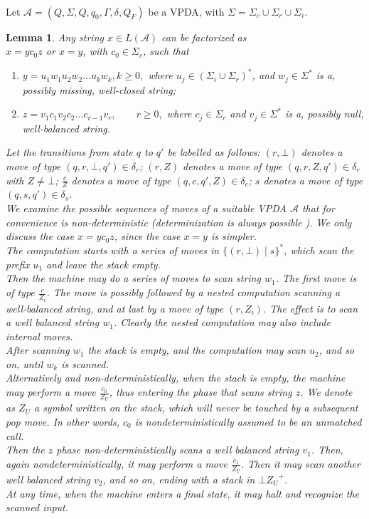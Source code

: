 \documentclass[3p,11pt]{elsarticle}
\newtheorem{lemma}[theorem]{Lemma}
\newenvironment{proof}[1][Proof]{\begin{trivlist}
\item[\hskip \labelsep {\bfseries #1}]}{\end{trivlist}}
\begin{document}
\\
Let $\mathcal{A}=(Q, \Sigma,Q, q_0, \Gamma,  \delta, Q_F)$ be a VPDA, with $\Sigma=\Sigma_{c}\cup \Sigma_{r} \cup \Sigma_{i}$.
\begin{lemma}\label{LemmaStruttVPL}
 Any
string $x \in L(\mathcal{A})$ can be factorized as\\
$ x = y c_0 z$   or $x = y$,   with $c_0\in \Sigma_c$, such that
\begin{enumerate}
\item $ y=u_1 w_1 u_2 w_2 \ldots u_k w_k, k\geq 0, $ where $u_j \in (\Sigma_i \cup \Sigma_r)^\ast$, and $w_j\in \Sigma^\ast$ is a, possibly missing, well-closed string;
    \item
    $
 z = v_1 c_1 v_2 c_2 \ldots c_{r-1} v_r,\qquad r\geq 0,
    $
 where $c_j \in \Sigma_c$ and $v_j \in \Sigma^\ast$ is a, possibly null, well-balanced string.
\end{enumerate}
\begin{proof}
 Let the transitions from state $q$ to $q'$  be labelled as follows: $(r,\bot)$ denotes a move of type $(q,r,\bot,q')\in\delta_r$;
 $(r,Z)$  denotes a move of type $(q,r,Z,q')\in\delta_r$ with $Z\neq \bot$;
 $\frac{c}{Z}$  denotes a move of type $(q,c,q',Z)\in\delta_c$;
 $s$  denotes  a move of type $(q,s,q')\in\delta_s$.
 \\
  We examine the possible sequences of moves of a suitable VPDA $\mathcal{A}$ that for convenience is non-deterministic (determinization is always possible \cite{AluMad04}).
  We only discuss the case $x = y c_0 z$, since the case $x = y$ is simpler.
\\
The computation starts with a series of moves in $\{(r,\bot)\mid s\}^\ast$, which scan the prefix $u_1$
 and leave the stack empty.
\\ Then the machine may do a series of moves to scan string $w_1$.
    The first move is of type $\frac{c}{Z_i}$. The move is
 possibly followed  by a nested computation scanning a well-balanced string, and at last by a move of type $(r,Z_i)$. The effect is  to scan a well balanced string $w_1$. Clearly the nested computation may also include internal moves.
\\ After scanning $w_1$ the stack is empty, and the
 computation may scan  $u_2$, and so on, until $w_k$ is scanned.
\\ Alternatively and non-deterministically, when the stack is empty, the machine may perform a move
    $\frac{c_0}{Z_U}$,  thus  entering the phase that scans string $z$. We denote as $Z_U$ a symbol written on the stack, which will never be touched by a subsequent pop move. In other words, $c_0$ is nondeterministically assumed to be an unmatched call.
\\ Then the $z$ phase non-deterministically scans a well balanced string $v_{1}$. Then, again nondeterministically, it may
perform a move $\frac{c_1}{Z_U}$. Then it may scan another well balanced string $v_{2}$, and so on, ending with a stack in $\bot {Z_U}^+$.
\\
  At any time, when the machine enters a final state, it may halt and recognize the scanned input.
\end{proof}
\end{lemma}
\end{document}
